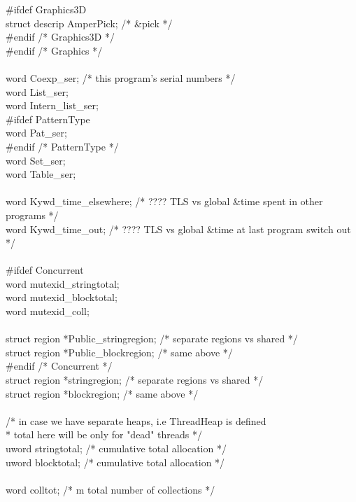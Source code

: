 \begin{iconcode}
   \#ifdef Graphics3D \\
      struct descrip AmperPick;				/* \&pick */ \\
   \#endif				/* Graphics3D */ \\
   \#endif				/* Graphics */ \\
\ \\   
   word Coexp\_ser;			/* this program's serial numbers */\\
   word List\_ser; \\
   word Intern\_list\_ser; \\
\#ifdef PatternType \\
   word Pat\_ser; \\
\#endif					/* PatternType */\\
   word Set\_ser; \\
   word Table\_ser; \\
\ \\
   word Kywd\_time\_elsewhere;		/* ???? TLS vs global \&time spent in other programs */ \\
   word Kywd\_time\_out;			/* ????  TLS vs global \&time at last program switch out */ \\
\ \\
\#ifdef Concurrent \\
   word mutexid\_stringtotal; \\
   word mutexid\_blocktotal; \\
   word mutexid\_coll;\\
\ \\
   struct region *Public\_stringregion;         /*  separate regions vs shared */ \\
   struct region *Public\_blockregion;          /*     same above   */ \\
\#endif					/* Concurrent */
\ \\
   struct region *stringregion;         /*  separate regions vs shared      */\\
   struct region *blockregion;          /*     same above     */ \\
\ \\
  /* in case we have separate heaps, i.e ThreadHeap is defined\\
   * total here will be only for "dead" threads */\\
   uword stringtotal;			/* cumulative total allocation */\\
   uword blocktotal;			/* cumulative total allocation */\\
\ \\
   word colltot;			/*  m      total number of collections */\\

\end{iconcode}
